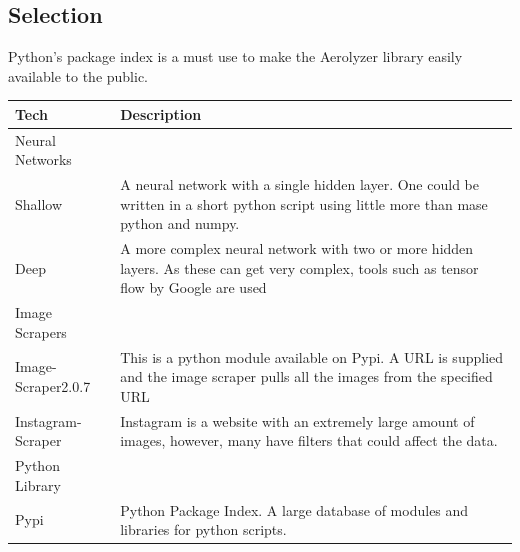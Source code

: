 \documentclass[onecolumn, draftclsnofoot,10pt, compsoc]{IEEEtran}
\begin{document}
\begin{singlespace}
\subsection{Selection}
Python's package index is a must use to make the Aerolyzer library easily available to the public. 


\begin{table}[h!]
\centering
 \begin{tabular}{||p{6cm}  p{11cm}||} 
 \hline
 Tech & Description\\ [0.5ex] 
 \hline\hline
 Neural Networks&\\
 \hline
 Shallow & A neural network with a single hidden layer. One could be written in a short python script using little more than mase python and numpy.\\
 
 Deep & A more complex neural network with two or more hidden layers. As these can get very complex, tools such as tensor flow by Google are used\\
 \hline
 Image Scrapers&\\
 \hline
 Image-Scraper2.0.7 & This is a python module available on Pypi. A URL is supplied and the image scraper pulls all the images from the specified URL \\
 Instagram-Scraper & Instagram is a website with an extremely large amount of images, however, many have filters that could affect the data. \\
 \hline
 Python Library&\\
 \hline
 Pypi & Python Package Index. A large database of modules and libraries for python scripts.  \\ [1ex] 
 \hline
 \end{tabular}
\end{table}
\fi
	\nocite{*}
	
	

\end{singlespace}
\end{document}
